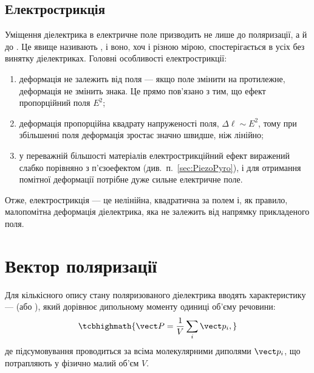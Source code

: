 \subsection*{Електрострикція}

Уміщення діелектрика в електричне поле призводить не лише до поляризації, а й до . Це явище називають
, і воно, хоч і різною мірою, спостерігається в усіх без винятку діелектриках. Головні особливості електрострикції:

\begin{enumerate}
	\item деформація не залежить від  поля --- якщо поле змінити на протилежне, деформація не змінить знака. Це прямо пов'язано з
	      тим, що ефект пропорційний  поля $E^2$;
	\item деформація пропорційна квадрату напруженості поля, $\Delta \ell \sim E^2$, тому при збільшенні поля деформація зростає значно швидше, ніж
	      лінійно;
	\item у переважній більшості матеріалів електрострикційний ефект виражений слабко порівняно з п'єзоефектом (див.~п.~\ref{sec:PiezoPyro}), і для
	      отримання помітної деформації потрібне дуже сильне електричне поле.
\end{enumerate}
Отже, електрострикція --- це нелінійна, квадратична за полем і, як правило, малопомітна деформація діелектрика, яка не залежить від напрямку
прикладеного поля.

\section{Вектор поляризації}

Для кількісного опису стану поляризованого діелектрика вводять  характеристику ---  (або
), який дорівнює дипольному моменту одиниці об'єму речовини:
\begin{equation}\label{eq:Pdef}
	\tcbhighmath{
		\vect P = \frac1V \sum_i \vect p_i,
	}
\end{equation}
де підсумовування проводиться за всіма молекулярними диполями $\vect p_i$, що потрапляють у фізично малий об'єм $V$.

